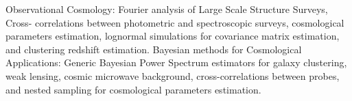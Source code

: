 

\begin{cvparagraph}


  \cventry
    {Observational Cosmology:} %
    {} %
    {} %
    {} %
    {
     Fourier analysis of Large Scale Structure Surveys, Cross- correlations between photometric and spectroscopic surveys, cosmological parameters estimation, lognormal simulations for covariance matrix estimation, and clustering redshift estimation.
    }
  \cventry
    {Bayesian methods for Cosmological Applications:} %
    {} %
    {} %
    {} %
    {
      Generic Bayesian Power Spectrum estimators for galaxy clustering, weak lensing, cosmic microwave background, cross-correlations between probes, and nested sampling for cosmological parameters estimation.
    }



\end{cvparagraph}
